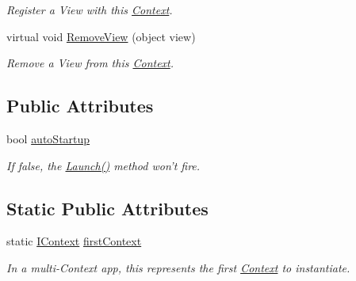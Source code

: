 \begin{DoxyCompactItemize}
\begin{DoxyCompactList}\small\item\em Register a View with this \hyperlink{classstrange_1_1extensions_1_1context_1_1impl_1_1_context}{Context}. \end{DoxyCompactList}\item 
\hypertarget{classstrange_1_1extensions_1_1context_1_1impl_1_1_context_a027f31fe58bb8a179119bed5973a2e30}{virtual void \hyperlink{classstrange_1_1extensions_1_1context_1_1impl_1_1_context_a027f31fe58bb8a179119bed5973a2e30}{Remove\-View} (object view)}\label{classstrange_1_1extensions_1_1context_1_1impl_1_1_context_a027f31fe58bb8a179119bed5973a2e30}

\begin{DoxyCompactList}\small\item\em Remove a View from this \hyperlink{classstrange_1_1extensions_1_1context_1_1impl_1_1_context}{Context}. \end{DoxyCompactList}\end{DoxyCompactItemize}
\subsection*{Public Attributes}
\begin{DoxyCompactItemize}
\item 
\hypertarget{classstrange_1_1extensions_1_1context_1_1impl_1_1_context_a3386ea2967ba720218b89eaefac77d56}{bool \hyperlink{classstrange_1_1extensions_1_1context_1_1impl_1_1_context_a3386ea2967ba720218b89eaefac77d56}{auto\-Startup}}\label{classstrange_1_1extensions_1_1context_1_1impl_1_1_context_a3386ea2967ba720218b89eaefac77d56}

\begin{DoxyCompactList}\small\item\em If false, the {\ttfamily \hyperlink{classstrange_1_1extensions_1_1context_1_1impl_1_1_context_a02c426aaa7b4cdae6bc1be3060b67dce}{Launch()}} method won't fire. \end{DoxyCompactList}\end{DoxyCompactItemize}
\subsection*{Static Public Attributes}
\begin{DoxyCompactItemize}
\item 
\hypertarget{classstrange_1_1extensions_1_1context_1_1impl_1_1_context_a91925d82f688390fea8c703ab4135c79}{static \hyperlink{interfacestrange_1_1extensions_1_1context_1_1api_1_1_i_context}{I\-Context} \hyperlink{classstrange_1_1extensions_1_1context_1_1impl_1_1_context_a91925d82f688390fea8c703ab4135c79}{first\-Context}}\label{classstrange_1_1extensions_1_1context_1_1impl_1_1_context_a91925d82f688390fea8c703ab4135c79}

\begin{DoxyCompactList}\small\item\em In a multi-\/\-Context app, this represents the first \hyperlink{classstrange_1_1extensions_1_1context_1_1impl_1_1_context}{Context} to instantiate. \end{DoxyCompactList}\end{DoxyCompactItemize}
